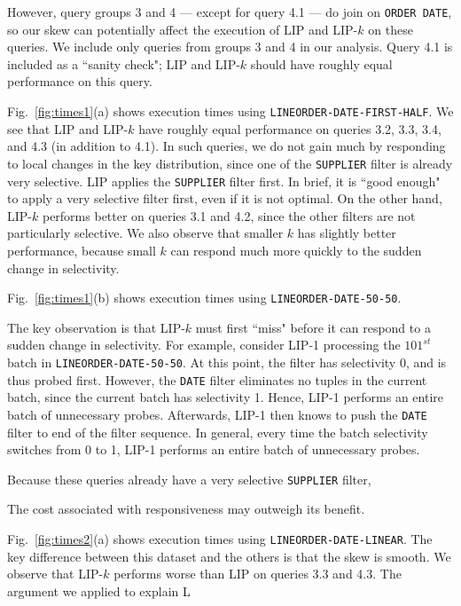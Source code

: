 However, query groups 3 and 4 --- except for query 4.1 --- do join on \texttt{ORDER DATE}, so our skew can potentially affect the execution of LIP and LIP-$k$ on these queries.
We include only queries from groups 3 and 4 in our analysis. 
Query 4.1 is included as a ``sanity check"; LIP and LIP-$k$ should have roughly equal performance on this query.

Fig.~\ref{fig:times1}(a) shows execution times using \texttt{LINEORDER-DATE-FIRST-HALF}. 
We see that LIP and LIP-$k$ have roughly equal performance on queries 3.2, 3.3, 3.4, and 4.3 (in addition to 4.1).
In such queries, we do not gain much by responding to local changes in the key distribution,
since one of the \texttt{SUPPLIER} filter is already very selective. 
LIP applies the \texttt{SUPPLIER} filter first.
In brief, it is ``good enough" to apply a very selective filter first, even if it is not optimal.
On the other hand, LIP-$k$ performs better on queries 3.1 and 4.2, 
since the other filters are not particularly selective. 
We also observe that smaller $k$ has slightly better performance, 
because small $k$ can respond much more quickly to the sudden change in selectivity.

Fig.~\ref{fig:times1}(b) shows execution times using \texttt{LINEORDER-DATE-50-50}. 

The key observation is that LIP-$k$ must first ``miss" before it can respond to a sudden change in selectivity.
For example, consider LIP-1 processing the $101^{st}$ batch in \texttt{LINEORDER-DATE-50-50}. 
At this point, the  filter has selectivity 0, and is thus probed first. 
However, the \texttt{DATE} filter eliminates no tuples in the current batch, since the current batch has selectivity 1.
Hence, LIP-1 performs an entire batch of unnecessary probes. 
Afterwards, LIP-1 then knows to push the \texttt{DATE} filter to end of the filter sequence. 
In general, every time the batch selectivity switches from 0 to 1, 
LIP-1 performs an entire batch of unnecessary probes. 

Because these queries already have a very selective \texttt{SUPPLIER} filter, 

The cost associated with responsiveness may outweigh its benefit. 

Fig.~\ref{fig:times2}(a) shows execution times using \texttt{LINEORDER-DATE-LINEAR}. 
The key difference between this dataset and the others is that the skew is smooth. 
We observe that LIP-$k$ performs worse than LIP on queries 3.3 and 4.3. 
The argument we applied to explain L

